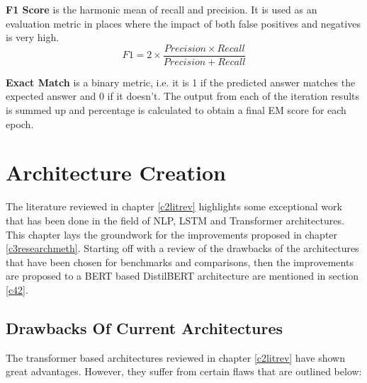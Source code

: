 \documentclass[a4paper,12pt]{report}
\begin{document}
	\textbf{F1 Score } is the harmonic mean of recall and precision. It is used as an evaluation metric in places where the impact of both false positives and negatives is very high.
		\begin{equation}\label{f1}
		F1 = 2 \times \dfrac{Precision \times Recall}{Precision + Recall}
	\end{equation}

	\textbf{Exact Match} is a binary metric, i.e. it is 1 if the predicted answer matches the expected answer and 0 if it doesn't. The output from each of the iteration results is summed up and percentage is calculated to obtain a final EM score for each epoch. 



  \chapter{Architecture Creation}\label{c4}

  	The literature reviewed in chapter \ref{c2litrev} highlights some exceptional work that has been done in the field of NLP, LSTM and Transformer architectures. This chapter lays the groundwork for the improvements proposed in chapter \ref{c3researchmeth}. Starting off with a review of the drawbacks of the architectures that have been chosen for benchmarks and comparisons, then the improvements are proposed to a BERT based DistilBERT architecture are mentioned in section \ref{c42}.


       \section{Drawbacks Of Current Architectures}\label{c41}

       The transformer based architectures reviewed in chapter \ref{c2litrev} have shown great advantages. However, they suffer from certain flaws that are outlined below:
\end{document}
